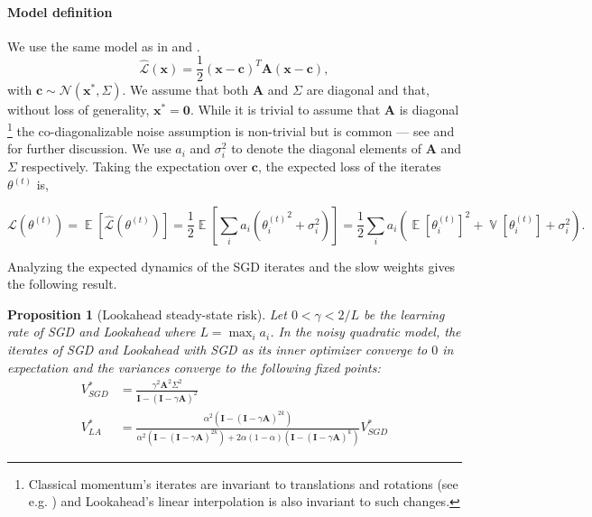 \documentclass{article}
\newcommand{\bx}{\mathbf{x}}
\newcommand{\bA}{\mathbf{A}}
\newcommand{\bI}{\mathbf{I}}
\newcommand{\bc}{\mathbf{c}}
\newcommand{\E}{\mathop{\mathbb{E}}}
\newcommand{\V}{\mathop{\mathbb{V}}}
\newtheorem{proposition}{Proposition}
\begin{document}
\paragraph{Model definition} We use the same model as in \citet{schaul2013no} and \citet{wu2018understanding}. 
\begin{equation}
    \hat{\mathcal{L}}(\bx) = \frac{1}{2} (\bx - \bc)^T \bA (\bx - \bc),
\end{equation}
with $\bc \sim \mathcal{N}(\bx^*, \Sigma)$. We assume that both $\bA$ and $\Sigma$ are diagonal and that, without loss of generality, $\bx^* = \mathbf{0}$. While it is trivial to assume that $\bA$ is diagonal \footnote{Classical momentum's iterates are invariant to translations and rotations (see e.g. \citet{sutskever2013importance})  and Lookahead's linear interpolation is also invariant to such changes.} the co-diagonalizable noise assumption is non-trivial but is common --- see \citet{wu2018understanding} and \citet{zhang2019algorithmic} for further discussion. We use $a_i$ and $\sigma_i^2$ to denote the diagonal elements of $\bA$ and $\Sigma$ respectively. Taking the expectation over $\bc$, the expected loss of the iterates $\theta^{(t)}$ is,

\begin{equation}\label{eqn:noisy_exp_loss}
    \mathcal{L}(\theta^{(t)}) = \E[\hat{\mathcal{L}}(\theta^{(t)})]
    = \frac{1}{2} \E [\sum_i a_i ({\theta_i^{(t)}}^2 + \sigma_i^2)]
    = \frac{1}{2}\sum_i a_i (\E[\theta_i^{(t)}]^2 + \V[\theta_i^{(t)}] + \sigma_i^2).
\end{equation}

Analyzing the expected dynamics of the SGD iterates and the slow weights gives the following result.



\begin{proposition}[Lookahead steady-state risk]\label{prop:noisy_quad}
Let $0 < \gamma < 2/L$ be the learning rate of SGD and Lookahead where $L=\max_i a_i$. In the noisy quadratic model, the iterates of SGD and Lookahead with SGD as its inner optimizer converge to $0$ in expectation and the variances converge to the following fixed points:
\begin{align}
    V_{SGD}^* &= \frac{\gamma^2 \bA^2 \Sigma^2}{\bI - (\bI - \gamma \bA)^2} \\
    V_{LA}^* &= \frac{\alpha^2 (\bI - (\bI - \gamma\bA)^{2k})}{\alpha^2 (\bI - (\bI - \gamma\bA)^{2k}) + 2\alpha(1 - \alpha)(\bI - (\bI - \gamma\bA)^k)} V_{SGD}^*
        \end{align}
\end{proposition}
\end{document}
